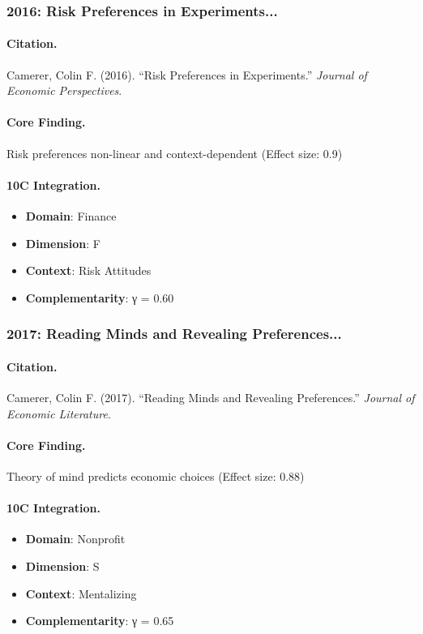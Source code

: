 \subsubsection{2016: Risk Preferences in Experiments...}

\paragraph{Citation.}
Camerer, Colin F. (2016). ``Risk Preferences in Experiments.''
\textit{Journal of Economic Perspectives}.

\paragraph{Core Finding.}
Risk preferences non-linear and context-dependent (Effect size: 0.9)

\paragraph{10C Integration.}
\begin{itemize}[nosep]
  \item \textbf{Domain}: Finance
  \item \textbf{Dimension}: F
  \item \textbf{Context}: Risk Attitudes
  \item \textbf{Complementarity}: γ = 0.60
\end{itemize}

\subsubsection{2017: Reading Minds and Revealing Preferences...}

\paragraph{Citation.}
Camerer, Colin F. (2017). ``Reading Minds and Revealing Preferences.''
\textit{Journal of Economic Literature}.

\paragraph{Core Finding.}
Theory of mind predicts economic choices (Effect size: 0.88)

\paragraph{10C Integration.}
\begin{itemize}[nosep]
  \item \textbf{Domain}: Nonprofit
  \item \textbf{Dimension}: S
  \item \textbf{Context}: Mentalizing
  \item \textbf{Complementarity}: γ = 0.65
\end{itemize}

